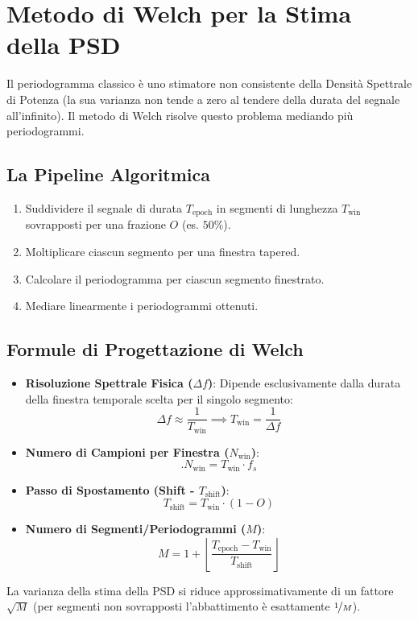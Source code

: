 \documentclass[10pt, letterpaper]{report}
\begin{document}
\section{Metodo di Welch per la Stima della PSD}
Il periodogramma classico è uno stimatore non consistente della Densità Spettrale di Potenza (la sua varianza non tende a zero al tendere della durata del segnale all'infinito).
Il metodo di Welch risolve questo problema mediando più periodogrammi.

\subsection{La Pipeline Algoritmica}
\begin{enumerate}
    \item Suddividere il segnale di durata $T_{\text{epoch}}$ in segmenti di lunghezza $T_{\text{win}}$ sovrapposti per una frazione $O$ (es. $50\%$).
    \item Moltiplicare ciascun segmento per una finestra tapered.
    \item Calcolare il periodogramma per ciascun segmento finestrato.
    \item Mediare linearmente i periodogrammi ottenuti.
\end{enumerate}

\subsection{Formule di Progettazione di Welch}
\begin{itemize}
    \item \textbf{Risoluzione Spettrale Fisica ($\Delta f$)}: Dipende esclusivamente dalla durata della finestra temporale scelta per il singolo segmento:
    \[
    \Delta f \approx \frac{1}{T_{\text{win}}} \implies T_{\text{win}} = \frac{1}{\Delta f}
    \]
    \item \textbf{Numero di Campioni per Finestra ($N_{\text{win}}$)}:
    \[
    \Big. N_{\text{win}} = T_{\text{win}} \cdot f_s
    \]
    \item \textbf{Passo di Spostamento (Shift - $T_{\text{shift}}$)}:
    \[
    T_{\text{shift}} = T_{\text{win}} \cdot (1 - O)
    \]
    \item \textbf{Numero di Segmenti/Periodogrammi ($M$)}:
    \[
    M = 1 + \left\lfloor \frac{T_{\text{epoch}} - T_{\text{win}}}{T_{\text{shift}}} \right\rfloor
    \]
\end{itemize}
La varianza della stima della PSD si riduce approssimativamente di un fattore $\sqrt{M}$ (per segmenti non sovrapposti l'abbattimento è esattamente $\nicefrac{1}{M}$).
\end{document}
